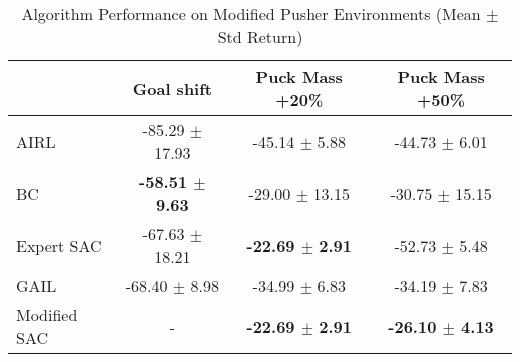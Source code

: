 \documentclass{article}
\begin{document}

\begin{table}
\caption{Algorithm Performance on Modified Pusher Environments (Mean $\pm$ Std Return)}
\label{tab:perf_mod_pusher}
\begin{adjustbox}{max width=\textwidth, center}
\begin{tabular}{lccc}
\toprule
 & Goal shift & Puck Mass +20\% & Puck Mass +50\% \\
\midrule
AIRL & -85.29 $\pm$ 17.93 & -45.14 $\pm$ 5.88 & -44.73 $\pm$ 6.01 \\
BC & \textbf{-58.51 $\pm$ 9.63} & -29.00 $\pm$ 13.15 & -30.75 $\pm$ 15.15 \\
Expert SAC & -67.63 $\pm$ 18.21 & \textbf{-22.69 $\pm$ 2.91} & -52.73 $\pm$ 5.48 \\
GAIL & -68.40 $\pm$ 8.98 & -34.99 $\pm$ 6.83 & -34.19 $\pm$ 7.83 \\
Modified SAC & - & \textbf{-22.69 $\pm$ 2.91} & \textbf{-26.10 $\pm$ 4.13} \\
\bottomrule
\end{tabular}
\end{adjustbox}
\end{table}
\end{document}
